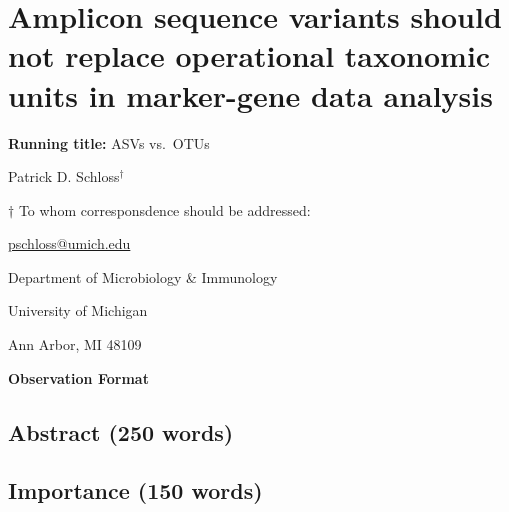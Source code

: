 \documentclass[
]{article}
\author{}
\date{\vspace{-2.5em}}
\begin{document}
\hypertarget{amplicon-sequence-variants-should-not-replace-operational-taxonomic-units-in-marker-gene-data-analysis}{%
\section{Amplicon sequence variants should not replace operational
taxonomic units in marker-gene data
analysis}\label{amplicon-sequence-variants-should-not-replace-operational-taxonomic-units-in-marker-gene-data-analysis}}

\vspace{20mm}

\textbf{Running title:} ASVs vs.~OTUs

\vspace{20mm}

Patrick D. Schloss\({^\dagger}\)

\vspace{40mm}

\({\dagger}\) To whom corresponsdence should be addressed:

\href{mailto:pschloss@umich.edu}{pschloss@umich.edu}

Department of Microbiology \& Immunology

University of Michigan

Ann Arbor, MI 48109

\vspace{20mm}

\textbf{Observation Format}

\newpage

\hypertarget{abstract-250-words}{%
\subsection{Abstract (250 words)}\label{abstract-250-words}}

\hypertarget{importance-150-words}{%
\subsection{Importance (150 words)}\label{importance-150-words}}

\newpage
\end{document}
